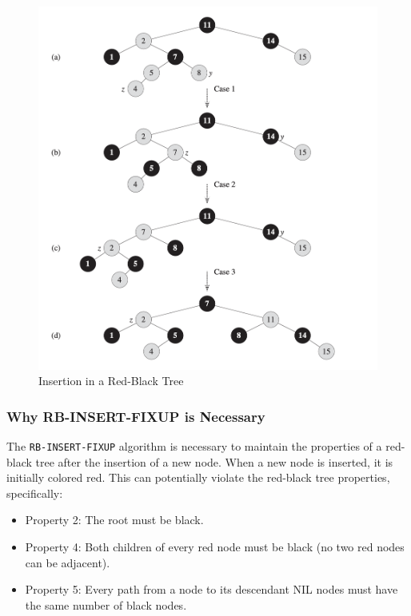 \begin{figure}
    \centering
    \includegraphics[width=\textwidth]{assets/insertion_rbt.png}
    \caption{Insertion in a Red-Black Tree}
\end{figure}

\newpage 
\subsubsection*{Why RB-INSERT-FIXUP is Necessary}

The \texttt{RB-INSERT-FIXUP} algorithm is necessary to maintain the properties of a red-black tree after the insertion of a new node. When a new node is inserted, it is initially colored red. This can potentially violate the red-black tree properties, specifically:

\begin{itemize}
    \item Property 2: The root must be black.
    \item Property 4: Both children of every red node must be black (no two red nodes can be adjacent).
    \item Property 5: Every path from a node to its descendant NIL nodes must have the same number of black nodes.
\end{itemize}

